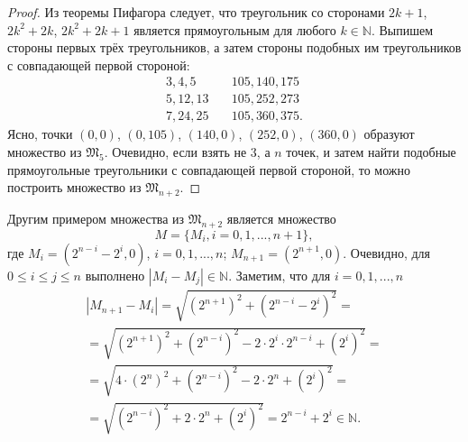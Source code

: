 \begin{proof}
	Из теоремы Пифагора следует, что треугольник со сторонами
	$2k+1$, $2k^2+2k$, $2k^2+2k+1$
	является прямоугольным для любого $k\in\mathbb{N}$.
	Выпишем стороны первых трёх треугольников,
	а затем стороны подобных им треугольников с совпадающей первой стороной:
	\begin{equation}
		\label{eq:PifagTriangles}
		\begin{array}{ll}
			3,  4,  5 & \quad 105, 140, 175 \\
			5, 12, 13 & \quad 105, 252, 273 \\
			7, 24, 25 & \quad 105, 360, 375.
		\end{array}
	\end{equation}
	Ясно, точки $(0,0)$, $(0,105)$, $(140,0)$, $(252,0)$, $(360,0)$
	образуют множество из $\mathfrak{M}_5$.
	Очевидно, если взять не 3, а $n$ точек, и затем найти подобные
	прямоугольные треугольники с совпадающей первой стороной,
	то можно построить множество из $\mathfrak{M}_{n+2}$.
\end{proof}

Другим примером множества из $\mathfrak{M}_{n+2}$ является множество
\begin{equation*}
	M = \{M_i, i =0,1,...,n+1\},
\end{equation*}
где
$M_i = (2^{n-i}-2^i,0)$, $i=0,1,...,n$;
$M_{n+1} = (2^{n+1},0)$.
Очевидно, для $0\leqslant i \leqslant j \leqslant n$ выполнено
$|M_i- M_j|\in\mathbb{N}$.
Заметим, что для $i=0,1,...,n$
\begin{multline*}
	|M_{n+1} - M_i| =
	\sqrt{(2^{n+1})^2 + (2^{n-i}-2^i)^2}
	=
	\\=
	\sqrt{(2^{n+1})^2 + (2^{n-i})^2 - 2\cdot 2^i \cdot 2^{n-i} + (2^i)^2}
	=
	\\=
	\sqrt{4\cdot (2^{n})^2 + (2^{n-i})^2 - 2\cdot 2^{n} + (2^i)^2}
	=
	\\=
	\sqrt{(2^{n-i})^2 + 2\cdot 2^{n} + (2^i)^2}
	=
	2^{n-i} + 2^i
	\in\mathbb{N}
	.
\end{multline*}

